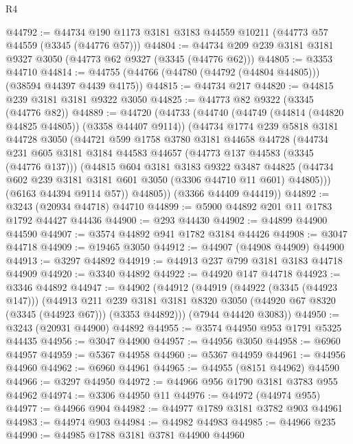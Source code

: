 \begin{lexlean}{R4}
\begin{coremodule}
@44792 := @44734 @190 @1173 @3181 @3183 @44559 @10211 (@44773 @57 @44559 (@3345 (@44776 @57)))
@44804 := @44734 @209 @239 @3181 @3181 @9327 @3050 (@44773 @62 @9327 (@3345 (@44776 @62)))
@44805 := @3353 @44710
@44814 := @44755 (@44766 (@44780 (@44792 (@44804 @44805))) (@38594 @44397 @4439 @4175))
@44815 := @44734 @217
@44820 := @44815 @239 @3181 @3181 @9322 @3050
@44825 := @44773 @82 @9322 (@3345 (@44776 @82))
@44889 := @44720
    (@44733
      (@44740
        (@44749 (@44814 (@44820 @44825 @44805)) (@3358 @44407 @9114))
        (@44734
          @1774
          @239
          @5818
          @3181
          @44728
          @3050
          (@44721
            @599
            @1758
            @3780
            @3181
            @44658
            @44728
            (@44734
              @231
              @605
              @3181
              @3184
              @44583
              @44657
              (@44773 @137 @44583 (@3345 (@44776 @137)))
              (@44815
                @604
                @3181
                @3183
                @9322
                @3487
                @44825
                (@44734 @602 @239 @3181 @3181 @601 @3050 (@3306 @44710 @11 @601) @44805)))
            (@6163 @44394 @9114 @57))
          @44805))
      (@3366 @44409 @44419))
@44892 := @3243 (@20934 @44718) @44710
@44899 := @5900 @44892 @201 @11 @1783 @1792 @44427 @44436
@44900 := @293 @44430
@44902 := @44899 @44900 @44590
@44907 := @3574 @44892 @941 @1782 @3184 @44426
@44908 := @3047 @44718
@44909 := @19465 @3050
@44912 := @44907 (@44908 @44909) @44900
@44913 := @3297 @44892
@44919 := @44913 @237 @799 @3181 @3183 @44718 @44909
@44920 := @3340 @44892
@44922 := @44920 @147 @44718
@44923 := @3346 @44892
@44947 := @44902
    (@44912
      (@44919
        (@44922 (@3345 (@44923 @147)))
        (@44913
          @211
          @239
          @3181
          @3181
          @8320
          @3050
          (@44920 @67 @8320 (@3345 (@44923 @67)))
          (@3353 @44892)))
      (@7944 @44420 @3083))
@44950 := @3243 (@20931 @44900) @44892
@44955 := @3574 @44950 @953 @1791 @5325 @44435
@44956 := @3047 @44900
@44957 := @44956 @3050
@44958 := @6960 @44957
@44959 := @5367 @44958
@44960 := @5367 @44959
@44961 := @44956 @44960
@44962 := @6960 @44961
@44965 := @44955 (@8151 @44962) @44590
@44966 := @3297 @44950
@44972 := @44966 @956 @1790 @3181 @3783 @955 @44962
@44974 := @3306 @44950 @11
@44976 := @44972 (@44974 @955)
@44977 := @44966 @904
@44982 := @44977 @1789 @3181 @3782 @903 @44961
@44983 := @44974 @903
@44984 := @44982 @44983
@44985 := @44966 @235
@44990 := @44985 @1788 @3181 @3781 @44900 @44960

\end{coremodule}
\end{lexlean}
